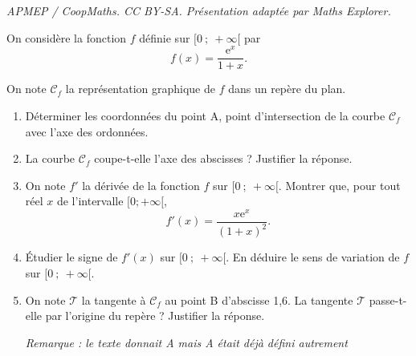 \documentclass[10pt]{article}
\providecommand{\e}{{\mathrm{e}}}
\begin{document}
\noindent\textit{APMEP / CoopMaths. CC BY-SA. Présentation adaptée par Maths Explorer.}\par\medskip
\medskip

On considère la fonction $f$ définie sur $[0~;~+\infty[$ par \[f(x) =\dfrac{\e^x}{1+x}.\]

On note $\mathcal{C}_f$ la représentation graphique de $f$ dans un repère du plan.

\medskip

\begin{enumerate}
\item Déterminer les coordonnées du point A, point d'intersection de la courbe $\mathcal{C}_f$
avec l'axe des ordonnées.
\item La courbe $\mathcal{C}_f$ coupe-t-elle l'axe des abscisses ? Justifier la réponse.
\item On note $f'$ la dérivée de la fonction $f$ sur $[0~;~+\infty[$. Montrer que, pour tout
réel $x$ de l'intervalle $[0; +\infty[$, \[f'(x) =\dfrac{x\e^x}{(1 + x)^2}.\]
\item Étudier le signe de $f'(x)$ sur $[0~;~+\infty[$. En déduire le sens de variation de $f$ sur
$[0~;~+\infty[$.

\item On note $\mathcal{T}$ la tangente à $\mathcal{C}_f$ au point B d'abscisse 1,6. La tangente $\mathcal{T}$ passe-t-elle par l'origine du repère ? Justifier la réponse.

\emph{Remarque : \footnotesize {le texte donnait A mais A était déjà défini autrement}}
\end{enumerate}

\vspace{0,5cm}
\end{document}
